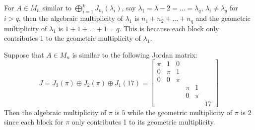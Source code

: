\noindent For $A \in M_n$ similar to $\bigoplus_{i=1}^k J_{n_i}(\lambda_i)$, say $\lambda_1 = \lambda-2 = \dots = \lambda_q$, $\lambda_i \not= \lambda_q$ for $i > q$, then the algebraic multiplicity of $\lambda_1$ is $n_1 + n_2 + \dots + n_q$ and the geometric multiplicity of $\lambda_1$ is $1 + 1 + \dots + 1 = q$. This is because each block only contributes 1 to the geometric multiplicity of $\lambda_1$.

\begin{example}
Suppose that $A \in M_n$ is similar to the following Jordan matrix:
$$
J 
    = J_3(\pi) \oplus J_2(\pi) \oplus J_1(17) 
    = \begin{bmatrix}
          \pi & 1 & 0 & & & \\
           0 & \pi & 1 & & & \\
           0 & 0 & \pi & & & \\
             & & & \pi & 1 & \\
             & & & 0 & \pi & \\
             & & & & & 17
        \end{bmatrix}
$$
Then the algebraic multiplicity of $\pi$ is $5$ while the geometric multiplicity of $\pi$ is 2 since each block for $\pi$ only contributes 1 to its geometric multiplicity. \\


\end{example}
